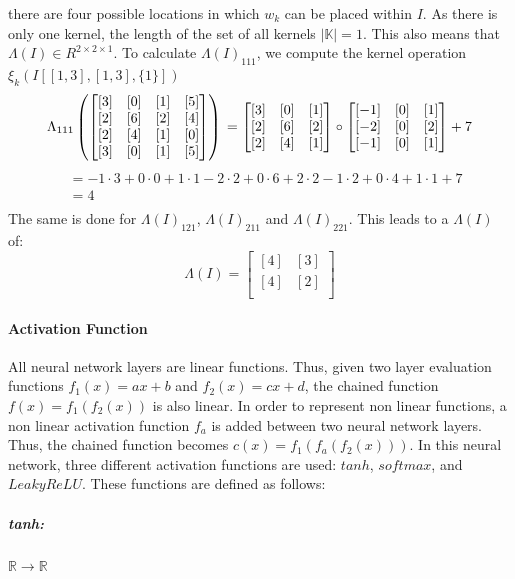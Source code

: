 \documentclass[12pt]{article}
\begin{document}
there are four possible locations in which \(w_k\) can be placed within \(I\). As there is only one kernel, the length of the set of all kernels \(|\mathbb{K}| = 1\). This also means that \(\Lambda(I) \in R^{2 \times 2 \times 1}\). To calculate \(\Lambda(I)_{111}\), we compute the kernel operation \(\xi_k(I[[1,3],[1,3],\{1\}])\)
\begin{equation}
\label{eq:conv:eg}
\Lambda_{111}
\left(\begin{bmatrix}
[3] & [0] & [1] & [5] \\
[2] & [6] & [2] & [4] \\
[2] & [4] & [1] & [0] \\
[3] & [0] & [1] & [5] \\
\end{bmatrix}\right)\\
 = \begin{bmatrix}
[3] & [0] & [1] \\
[2] & [6] & [2] \\
[2] & [4] & [1] \\
\end{bmatrix} \circ 
\begin{bmatrix}
[-1] & [0] & [1] \\
[-2] & [0] & [2] \\
[-1] & [0] & [1]
\end{bmatrix} + 7
\end{equation}
\begin{align*}
&= -1 \cdot 3 + 0 \cdot 0 + 1 \cdot 1 - 2 \cdot 2 + 0 \cdot 6 + 2 \cdot 2 -1 \cdot 2 + 0 \cdot 4 + 1 \cdot 1 + 7\\
&= 4\\
\end{align*}
The same is done for \(\Lambda(I)_{121}\), \(\Lambda(I)_{211}\) and \(\Lambda(I)_{221}\). This leads to a \(\Lambda(I)\) of:
\[
\Lambda(I) = \begin{bmatrix}
[4] & [3] \\
[4] & [2] \\
\end{bmatrix}
\]
\paragraph{Activation Function}
All neural network layers are linear functions. Thus, given two layer evaluation functions \(f_1(x) = ax + b\) and \(f_2(x) = cx + d\), the chained function \(f(x) = f_1(f_2(x))\) is also linear.
In order to represent non linear functions, a non linear activation function \(f_a\) is added between two neural network layers. Thus, the chained function becomes \(c(x) = f_1(f_a(f_2(x)))\). In this neural network, three different activation functions are used: \(tanh\), \(softmax\), and \(LeakyReLU\). These functions are defined as follows:
\subparagraph*{tanh:}\(\mathbb{R}\to \mathbb{R}\)
\end{document}
